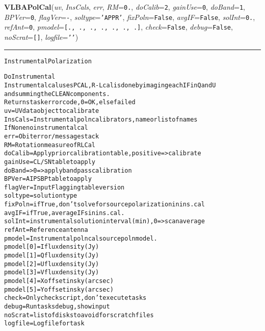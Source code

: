     \label{VLBACal:VLBAPolCal}
    \vspace{0.5ex}

    \begin{boxedminipage}{\textwidth}

    \raggedright \textbf{VLBAPolCal}(\textit{uv}, \textit{InsCals}, \textit{err}, \textit{RM}=\texttt{0\-.\-}, \textit{doCalib}=\texttt{2\-}, \textit{gainUse}=\texttt{0\-}, \textit{doBand}=\texttt{1\-}, \textit{BPVer}=\texttt{0\-}, \textit{flagVer}=\texttt{-\-}, \textit{soltype}=\texttt{'\-A\-P\-P\-R\-'\-}, \textit{fixPoln}=\texttt{F\-a\-l\-s\-e\-}, \textit{avgIF}=\texttt{F\-a\-l\-s\-e\-}, \textit{solInt}=\texttt{0\-.\-}, \textit{refAnt}=\texttt{0\-}, \textit{pmodel}=\texttt{[\-.\-,\-~\-.\-,\-~\-.\-,\-~\-.\-,\-~\-.\-,\-~\-.\-,\-~\-.\-]\-}, \textit{check}=\texttt{F\-a\-l\-s\-e\-}, \textit{debug}=\texttt{F\-a\-l\-s\-e\-}, \textit{noScrat}=\texttt{[\-]\-}, \textit{logfile}=\texttt{'\-'\-})

    \vspace{-1.5ex}

    \rule{\textwidth}{0.5\fboxrule}
\begin{alltt}
Instrumental Polarization 

Do Instrumental
Instrumental cal uses PCAL, R-L cal is done by imaging each IF in Q and U
and summing the CLEAN components.
Returns task error code, 0=OK, else failed
uv       = UV data object to calibrate
InsCals  = Instrumental poln calibrators, name or list of names
           If None no instrumental cal
err      = Obit error/message stack
RM       = Rotation measure of RLCal
doCalib  = Apply prior calibration table, positive={\textgreater}calibrate
gainUse  = CL/SN table to apply
doBand   = {\textgreater}0 ={\textgreater} apply bandpass calibration
BPVer    = AIPS BP table to apply
flagVer  = Input Flagging table version
soltype  = solution type
fixPoln  = if True, don't solve for source polarization in ins. cal
avgIF    = if True, average IFs in ins. cal.
solInt   = instrumental solution interval (min), 0={\textgreater} scan average
refAnt   = Reference antenna
pmodel   = Instrumental poln cal source poln model.
           pmodel[0] = I flux density (Jy)
           pmodel[1] = Q flux density (Jy)
           pmodel[2] = U flux density (Jy)
           pmodel[3] = V flux density (Jy)
           pmodel[4] = X offset in sky (arcsec)
           pmodel[5] = Y offset in sky (arcsec)
check    = Only check script, don't execute tasks
debug    = Run tasks debug, show input
noScrat  = list of disks to avoid for scratch files
logfile  = Log file for task\end{alltt}

    \vspace{1ex}

    \end{boxedminipage}

